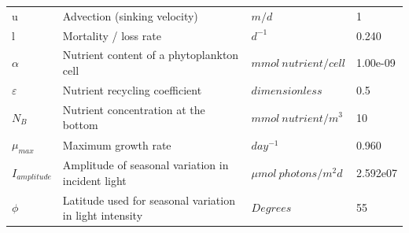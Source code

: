 \begin{table}[h!]
{\begin{tabular}{@{}llll@{}}
u            & Advection (sinking velocity)  & $m/d$ & 1         \\
l            & Mortality / loss rate   & $d^{-1}$     & 0.240     \\
$\alpha$     & Nutrient content of a phytoplankton cell & $mmol \: nutrient/cell$ & 1.00e-09  \\
$\varepsilon$  & Nutrient recycling coefficient  & $dimensionless$ & 0.5       \\
$N_B$  & Nutrient concentration at the bottom & $mmol \: nutrient/m^3$  & 10    \\
$\mu_{max}$         & Maximum growth rate   & $day^{-1}$    & 0.960     \\
$I_{amplitude}$  & Amplitude of seasonal variation in incident light       & $\mu mol \: photons/m^2 d$ & 2.592e07  \\
$\phi$          & Latitude used for seasonal variation in light intensity & $Degrees$            & 55        \\ \bottomrule
\end{tabular}%
}
\end{table}

\newpage
